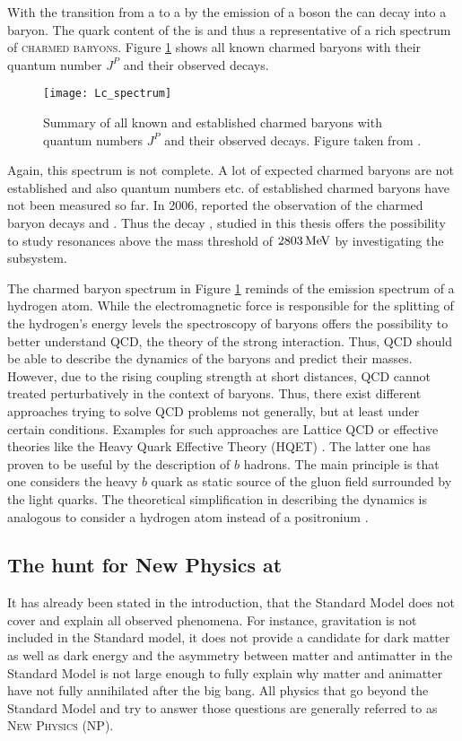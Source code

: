 With the transition from a \bquark to a \cquark by the emission of a \Wm boson the \Lb can decay into a \Lc baryon.
The quark content of the \Lc is \uquark\dquark\cquark and thus a representative of a rich spectrum of \textsc{charmed baryons}.
Figure \ref{fig:Lc_spectrum} shows all known charmed baryons with their quantum number $J^P$ and their observed decays.
\begin{figure}[ptb]
    \centering
	\texttt{[image: Lc\_spectrum]}	
	\caption{Summary of all known and established charmed baryons with quantum numbers $J^P$ and their observed decays. Figure taken from \cite{PDG}.}
	\label{fig:Lc_spectrum}
\end{figure}
Again, this spectrum is not complete.
A lot of expected charmed baryons are not established and also quantum numbers etc. of established charmed baryons have not been measured so far.
In 2006, \babar reported the observation of the charmed baryon decays \decay{\LcResI}{\Dz\proton} and \decay{\LcResII}{\Dz\proton} \cite{BaBar_D0p}.
Thus the decay \LbToDpmunuX, studied in this thesis offers the possibility to study \Lc resonances above the \Dz\proton mass threshold of $2803\mathrm{\,Me\kern -0.1em V}$ by investigating the \Dz\proton subsystem.

The charmed baryon spectrum in Figure \ref{fig:Lc_spectrum} reminds of the emission spectrum of a hydrogen atom.
While the electromagnetic force is responsible for the splitting of the hydrogen's energy levels the spectroscopy of baryons offers the possibility to better understand QCD, the theory of the strong interaction.
Thus, QCD should be able to describe the dynamics of the baryons and predict their masses.
However, due to the rising coupling strength \as at short distances, QCD cannot treated perturbatively in the context of baryons.
Thus, there exist different approaches trying to solve QCD problems not generally, but at least under certain conditions.
Examples for such approaches are Lattice QCD \cite{LatticeQCD} or effective theories like the Heavy Quark Effective Theory (HQET) \cite{HQET_Introduction}.
The latter one has proven to be useful by the description of $b$ hadrons.
The main principle is that one considers the heavy $b$ quark as static source of the gluon field surrounded by the light quarks.
The theoretical simplification in describing the dynamics is analogous to consider a hydrogen atom instead of a positronium \cite{HQET_Introduction}.

\subsection{The hunt for New Physics at \lhcb}
It has already been stated in the introduction, that the Standard Model does not cover and explain all observed phenomena.
For instance, gravitation is not included in the Standard model, it does not provide a candidate for dark matter as well as dark energy and the asymmetry between matter and antimatter in the Standard Model is not large enough to fully explain why matter and animatter have not fully annihilated after
the big bang.
All physics that go beyond the Standard Model and try to answer those questions are generally referred to as \textsc{New Physics (NP)}.

